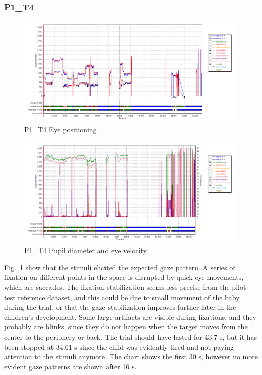 \subsubsection{P1\_T4}
\label{sec:P1_T4}

\begin{figure}[t]
  \centering
  \includegraphics[width=.8\textwidth]{figures/graphs/P1_T4(saccades)_XY.png}
  \caption[P1\_T4 Eye positioning]{P1\_T4 Eye positioning}
  \label{fig:P1_T4_pos}
\end{figure}

\begin{figure}[t]
  \centering
  \includegraphics[width=.8\textwidth]{figures/graphs/P1_T4(saccades)_VP.png}
  \caption[P1\_T4 Pupil size and velocity profile]{P1\_T4 Pupil diameter and eye velocity}
  \label{fig:P1_T4_vel}
\end{figure}

Fig.~\ref{fig:P1_T4_pos} show that the stimuli elicited the expected gaze pattern. A series of fixation on different points in the space is disrupted by quick eye movements, which are saccades. The fixation stabilization seems less precise from the pilot test reference dataset, and this could be due to small movement of the baby during the trial, or that the gaze stabilization improves further later in the children’s development. Some large artifacts are visible during fixations, and they probably are blinks, since they do not happen when the target moves from the center to the periphery or back.
The trial should have lasted for 43.7 s, but it has been stopped at 34.61 s since the child was evidently tired and not paying attention to the stimuli anymore. The chart shows the first 30 s, however no more evident gaze patterns are shown after 16 s.

